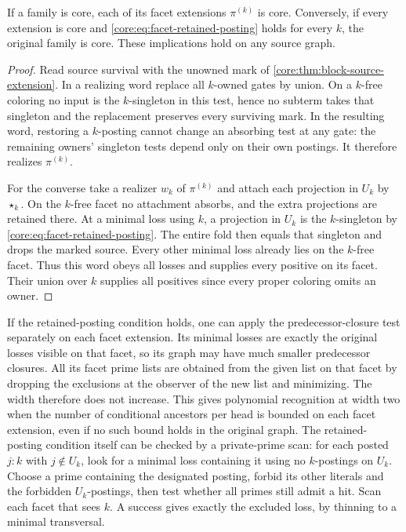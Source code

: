 \begin{proposition}
\label{core:prop:facet-source-gluing}
If a family is core, each of its facet extensions $\pi^{(k)}$ is core.
Conversely, if every extension is core and
\eqref{core:eq:facet-retained-posting} holds for every $k$, the original
family is core. These implications hold on any source graph.
\end{proposition}
\begin{proof}
Read source survival with the unowned mark of
\cref{core:thm:block-source-extension}. In a realizing word replace all
$k$-owned gates by union. On a $k$-free coloring no input is the
$k$-singleton in this test, hence no subterm
takes that singleton and the replacement preserves every surviving mark.
In the resulting word, restoring a $k$-posting cannot change an
absorbing test at any gate: the remaining owners' singleton tests
depend only on their own postings. It therefore realizes $\pi^{(k)}$.

For the converse take a realizer $w_k$ of $\pi^{(k)}$ and attach
each projection in $U_k$ by $\star_k$. On the $k$-free facet no
attachment absorbs, and the extra projections are retained there.
At a minimal loss using $k$, a projection in $U_k$ is the $k$-singleton
by \eqref{core:eq:facet-retained-posting}. The entire fold then equals
that singleton and drops the marked source. Every other minimal loss
already lies on the $k$-free facet. Thus this word obeys all losses
and supplies every positive on its facet. Their union over $k$
supplies all positives since every proper coloring omits an owner.
\end{proof}

If the retained-posting condition holds, one can
apply the predecessor-closure test separately on
each facet extension. Its minimal losses are
exactly the original losses visible on that
facet, so its graph may have much smaller
predecessor closures. All its facet prime lists
are obtained from the given list on that facet
by dropping the exclusions at the observer of
the new list and minimizing. The width therefore
does not increase. This gives polynomial recognition
at width two when the number of conditional
ancestors per head is bounded on each facet
extension, even if no such bound holds in the
original graph. The retained-posting condition
itself can be checked by a private-prime scan:
for each posted $j:k$ with $j\notin U_k$, look
for a minimal loss containing it using no
$k$-postings on $U_k$. Choose a prime containing
the designated posting, forbid its other literals
and the forbidden $U_k$-postings, then test
whether all primes still admit a hit. Scan each
facet that sees $k$. A success gives exactly the
excluded loss, by thinning to a minimal transversal.


